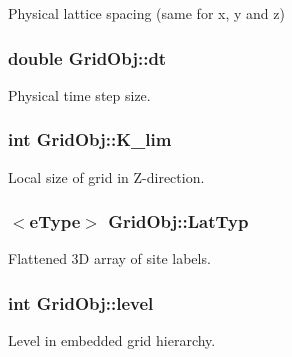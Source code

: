 Physical lattice spacing (same for x, y and z) 

\subsubsection[{\texorpdfstring{dt}{dt}}]{\setlength{\rightskip}{0pt plus 5cm}double Grid\+Obj\+::dt}\hypertarget{class_grid_obj_afd504b39f12eb0a237bc6313de94e094}{}\label{class_grid_obj_afd504b39f12eb0a237bc6313de94e094}


Physical time step size. 

\subsubsection[{\texorpdfstring{K\+\_\+lim}{K_lim}}]{\setlength{\rightskip}{0pt plus 5cm}int Grid\+Obj\+::\+K\+\_\+lim}\hypertarget{class_grid_obj_aaccc404f2fbdbaef8c5dd134f7d9e17f}{}\label{class_grid_obj_aaccc404f2fbdbaef8c5dd134f7d9e17f}


Local size of grid in Z-\/direction. 

\subsubsection[{\texorpdfstring{Lat\+Typ}{LatTyp}}]{$<${\bf e\+Type}$>$ Grid\+Obj\+::\+Lat\+Typ}\hypertarget{class_grid_obj_a8ce077fba648f767361039eb924c45ae}{}\label{class_grid_obj_a8ce077fba648f767361039eb924c45ae}


Flattened 3D array of site labels. 

\subsubsection[{\texorpdfstring{level}{level}}]{\setlength{\rightskip}{0pt plus 5cm}int Grid\+Obj\+::level}\hypertarget{class_grid_obj_a7dfedc4442a386ec15c8b03ca899c1a9}{}\label{class_grid_obj_a7dfedc4442a386ec15c8b03ca899c1a9}


Level in embedded grid hierarchy. 

